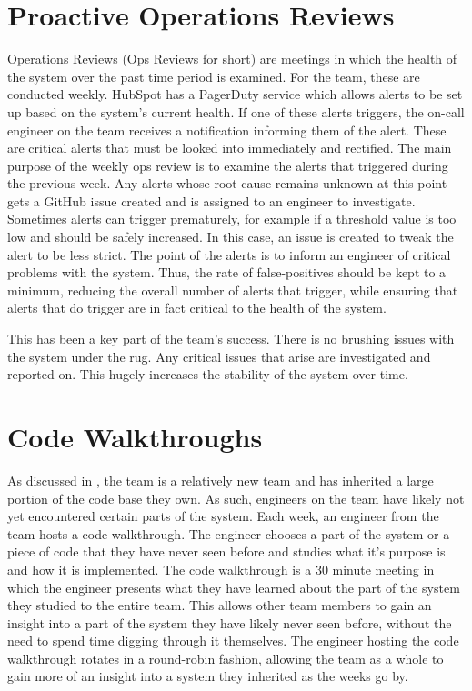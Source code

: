 \section{Proactive Operations Reviews}
Operations Reviews (Ops Reviews for short) are meetings in which the health of the system over the past time period is examined. For the \team{} team, these are conducted weekly. HubSpot has a PagerDuty service which allows alerts to be set up based on the system's current health. If one of these alerts triggers, the on-call engineer on the team receives a notification informing them of the alert. These are critical alerts that must be looked into immediately and rectified. The main purpose of the weekly ops review is to examine the alerts that triggered during the previous week. Any alerts whose root cause remains unknown at this point gets a GitHub issue created and is assigned to an engineer to investigate. Sometimes alerts can trigger prematurely, for example if a threshold value is too low and should be safely increased. In this case, an issue is created to tweak the alert to be less strict. The point of the alerts is to inform an engineer of critical problems with the system. Thus, the rate of false-positives should be kept to a minimum, reducing the overall number of alerts that trigger, while ensuring that alerts that do trigger are in fact critical to the health of the system.

This has been a key part of the \team{} team's success. There is no brushing issues with the system under the rug. Any critical issues that arise are investigated and reported on. This hugely increases the stability of the system over time. 

\section{Code Walkthroughs}
As discussed in , the \team{} team is a relatively new team and has inherited a large portion of the code base they own. As such, engineers on the team have likely not yet encountered certain parts of the system. Each week, an engineer from the team hosts a code walkthrough. The engineer chooses a part of the system or a piece of code that they have never seen before and studies what it's purpose is and how it is implemented. The code walkthrough is a 30 minute meeting in which the engineer presents what they have learned about the part of the system they studied to the entire team. This allows other team members to gain an insight into a part of the system they have likely never seen before, without the need to spend time digging through it themselves. The engineer hosting the code walkthrough rotates in a round-robin fashion, allowing the team as a whole to gain more of an insight into a system they inherited as the weeks go by. 

